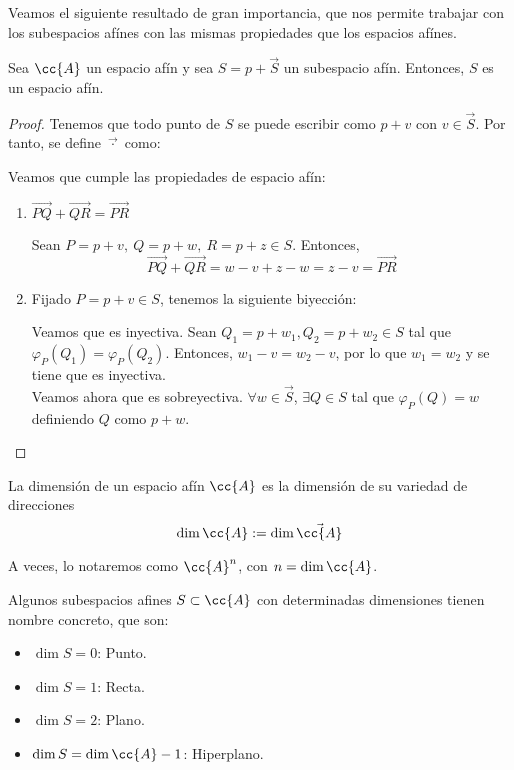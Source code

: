 Veamos el siguiente resultado de gran importancia, que nos permite trabajar con los subespacios afínes
con las mismas propiedades que los espacios afínes.
\begin{prop}
    Sea $\cc{A}$ un espacio afín y sea $S=p+\vec{S}$ un subespacio afín. Entonces,
    $S$ es un espacio afín.
\end{prop}
\begin{proof}
    Tenemos que todo punto de $S$ se puede escribir como $p+v$ con $v\in \vec{S}$. Por tanto, se define $\vec{\cdot}$ como:

    Veamos que cumple las propiedades de espacio afín:
    \begin{enumerate}
        \item $\vec{PQ}+\vec{QR}=\vec{PR}$

        Sean $P=p+v,~Q=p+w,~R=p+z\in S$. Entonces,
        \begin{equation*}
            \vec{PQ}+\vec{QR} = w-v+z-w = z-v = \vec{PR}
        \end{equation*}

        \item Fijado $P=p+v\in S$, tenemos la siguiente biyección:

        Veamos que es inyectiva. Sean $Q_1=p+w_1, Q_2=p+w_2\in S$ tal que $\varphi_P(Q_1)=\varphi_P(Q_2)$. Entonces, $w_1-v=w_2-v$, por lo que $w_1=w_2$ y se tiene que es inyectiva.\\

        Veamos ahora que es sobreyectiva. $\forall w\in \vec{S}$, $\exists Q\in S$ tal que $\varphi_P(Q)=w$ definiendo $Q$ como $p+w$.
    \end{enumerate}
\end{proof}


\begin{definicion}
    La dimensión de un espacio afín $\cc{A}$ es la dimensión de su variedad de direcciones
    $$\dim \cc{A} :=\dim \vec{\cc{A}}$$
    
    A veces, lo notaremos como $\cc{A}^n$, con $n=\dim \cc{A}$.
\end{definicion}

Algunos subespacios afines $S\subset \cc{A}$ con determinadas dimensiones tienen nombre concreto, que son:
\begin{itemize}
    \item $\dim S=0$: Punto.
    \item $\dim S=1$: Recta.
    \item $\dim S=2$: Plano.
    \item $\dim S=\dim \cc{A}-1$: Hiperplano.
\end{itemize}

